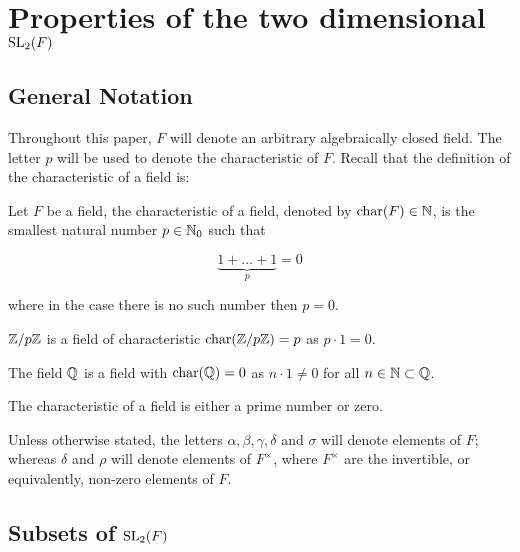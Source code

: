\chapter{Properties of the two dimensional $\operatorname{SL}_2(F)$}\label{Ch5_PropertiesOfSLOverAlgClosedField}


\section{General Notation}

Throughout this paper, $F$ will denote an arbitrary algebraically closed field. 
The letter $p$ will be used to denote the characteristic of $F$. 
Recall that the definition of the characteristic of a field is:

\begin{definition}
    Let $F$ be a field, the characteristic of a field, denoted by $\textrm{char}(F) \in \mathbb{N}$, is the smallest natural number $p \in \mathbb{N}_0$ such that

    \[
    \underbrace{1 + \ldots + 1}_{p} = 0
    \]

    where in the case there is no such number then $p = 0$.
\end{definition}

\begin{example}
    $\mathbb{Z} /p\mathbb{Z}$ is a field of characteristic $\textrm{char}(\mathbb{Z}/p\mathbb{Z}) = p$ as $p \cdot 1 = 0$.
\end{example}

\begin{example}
    The field $\mathbb{Q}$ is a field with $\textrm{char}(\mathbb{Q}) = 0$ as $n \cdot 1 \ne 0$ for all $n \in \mathbb{N} \subset \mathbb{Q}$.
\end{example}

\begin{remark}
    The characteristic of a field is either a prime number or zero.
\end{remark}

Unless otherwise stated, the letters $\alpha, \beta, \gamma, \delta$ and $\sigma$ will denote elements of $F$; 
whereas $\delta$ and $\rho$ will denote elements of $F^\times$, where $F^\times$ are the invertible, or equivalently, non-zero elements of $F$.

\section{Subsets of $\operatorname{SL}_2(F)$}

